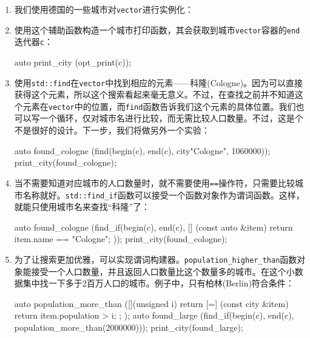 \begin{enumerate}
\item 我们使用德国的一些城市对\texttt{vector}进行实例化：

\begin{codebox}[cpp]
int main()
{
    const vector<city> c {
        {"Aachen", 246000},
        {"Berlin", 3502000},
        {"Braunschweig", 251000},
        {"Cologne", 1060000}
    };
\end{codebox}

\item 使用这个辅助函数构造一个城市打印函数，其会获取到城市\texttt{vector}容器的\texttt{end}迭代器\texttt{c}：

\begin{codebox}[cpp]
    auto print_city (opt_print(c));
\end{codebox}

\item 使用\texttt{std::find}在\texttt{vector}中找到相应的元素——科隆(Cologne)。因为可以直接获得这个元素，所以这个搜索看起来毫无意义。不过，在查找之前并不知道这个元素在\texttt{vector}中的位置，而\texttt{find}函数告诉我们这个元素的具体位置。我们也可以写一个循环，仅对城市名进行比较，而无需比较人口数量。不过，这是个不是很好的设计。下一步，我们将做另外一个实验：

\begin{codebox}[cpp]
{
    auto found_cologne (find(begin(c), end(c),
        city{"Cologne", 1060000}));
    print_city(found_cologne);
}
\end{codebox}

\item 当不需要知道对应城市的人口数量时，就不需要使用\texttt{==}操作符，只需要比较城市名称就好。\texttt{std::find\_if}函数可以接受一个函数对象作为谓词函数。这样，就能只使用城市名来查找“科隆”了：

\begin{codebox}[cpp]
{
    auto found_cologne (find_if(begin(c), end(c),
        [] (const auto &item) {
        return item.name == "Cologne";
        }));
    print_city(found_cologne);
}
\end{codebox}

\item 为了让搜索更加优雅，可以实现谓词构建器。\texttt{population\_higher\_than}函数对象能接受一个人口数量，并且返回人口数量比这个数量多的城市。在这个小数据集中找一下多于2百万人口的城市。例子中，只有柏林(Berlin)符合条件：

\begin{codebox}[cpp]
{
    auto population_more_than ([](unsigned i) {
        return [=] (const city &item) {
            return item.population > i;
        };
    });
    auto found_large (find_if(begin(c), end(c),
        population_more_than(2000000)));
    print_city(found_large);
}
\end{codebox}


\end{enumerate}
